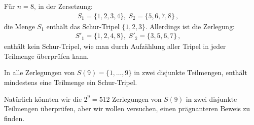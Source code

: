 \begin{example} Für $n=8$, in der Zersetzung:
\begin{align}
S_1 = \{1,2,3,4\},\; S_2 = \{5,6,7,8\}\,,
\label{eq.schur0}
\end{align}
die Menge $S_1$ enthält das Schur-Tripel $\{1,2,3\}$.
Allerdings ist die Zerlegung:
\begin{align}
S'_1 = \{1,2,4,8\},\; S'_2 = \{3,5,6,7\}\,,
\label{eq:schur1}
\end{align}
enthält kein Schur-Tripel, wie man durch Aufzählung aller Tripel in jeder Teilmenge überprüfen kann.
\end{example}

\begin{theorem}
In alle Zerlegungen von $S(9)=\{1,\ldots,9\}$ in zwei disjunkte Teilmengen, enthält mindestens eine Teilmenge ein Schur-Tripel.
\end{theorem}
Natürlich könnten wir die $2^9=512$ Zerlegungen von $S(9)$ in zwei disjunkte Teilmengen überprüfen, aber wir wollen versuchen, einen prägnanteren Beweis zu finden.
